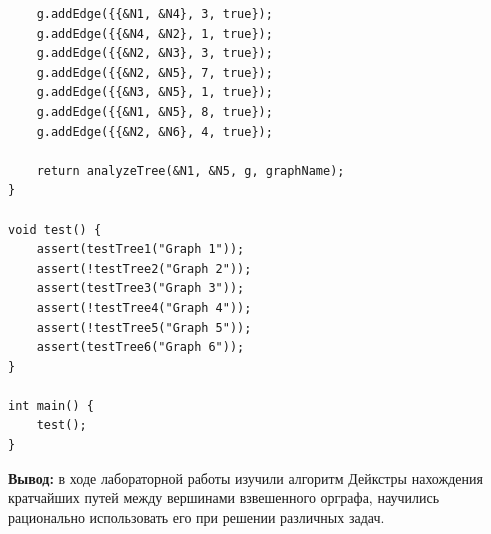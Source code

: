 \documentclass[a4paper,14pt]{extarticle}
\begin{document}
\begin{enumerate}[1.]
\begin{verbatim}
    g.addEdge({{&N1, &N4}, 3, true});
    g.addEdge({{&N4, &N2}, 1, true});
    g.addEdge({{&N2, &N3}, 3, true});
    g.addEdge({{&N2, &N5}, 7, true});
    g.addEdge({{&N3, &N5}, 1, true});
    g.addEdge({{&N1, &N5}, 8, true});
    g.addEdge({{&N2, &N6}, 4, true});

    return analyzeTree(&N1, &N5, g, graphName);
}

void test() {
    assert(testTree1("Graph 1"));
    assert(!testTree2("Graph 2"));
    assert(testTree3("Graph 3"));
    assert(!testTree4("Graph 4"));
    assert(!testTree5("Graph 5"));
    assert(testTree6("Graph 6"));
}

int main() {
    test();
}
                    \end{verbatim}
                    
        \end{enumerate}

\textbf{Вывод: } в ходе лабораторной работы изучили алгоритм Дейкстры нахождения кратчайших путей между вершинами взвешенного орграфа,
научились рационально использовать его при решении различных задач.
\end{document}
